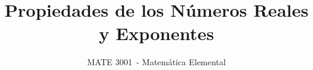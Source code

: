 \documentclass[12pt]{article}
\newcommand{\coursecode}{MATE 3001}      %
\newcommand{\coursename}{Matemática Elemental}     %
\newcommand{\lessontitle}{Propiedades de los Números Reales y Exponentes}    %
\newif\ifshowsolutions
\begin{document}
\title{\lessontitle}
\author{\coursecode\ - \coursename}
\date{}
\maketitle

\setcounter{section}{2}

         
       

\ifshowsolutions
    \newpage
    \section*{Soluciones}
    
\fi
\end{document}
